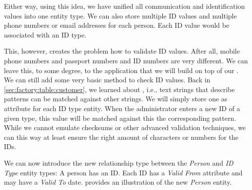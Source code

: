 Either way, using this idea, we have unified all communication and identification values into one entity type.
We can also store multiple ID values and multiple phone numbers or email addresses for each person.
Each ID value would be associated with an ID type.

This, however, creates the problem how to validate ID values.
After all, mobile phone numbers and passport numbers and ID numbers are very different.
We can leave this, to some degree, to the application that we will build on top of our \db.
We can still add some very basic method to check ID values.
Back in \cref{sec:factory:table:customer}, we learned about , i.e., text strings that describe patterns can be matched against other strings.
We will simply store one  as  attribute for each ID type entity.
When the administrator enters a new ID of a given type, this value will be matched against this the corresponding pattern.
While we cannot emulate checksums or other advanced validation techniques, we can this way at least ensure the right amount of characters or numbers for the IDs.

We can now introduce the new relationship type between the \emph{Person} and \emph{ID Type} entity types:
A person has an ID.
Each ID has a \emph{Valid From} attribute and may have a \emph{Valid To} date.
 provides an illustration of the new \emph{Person} entity.%
%
\FloatBarrier%
\endhsection%
%
